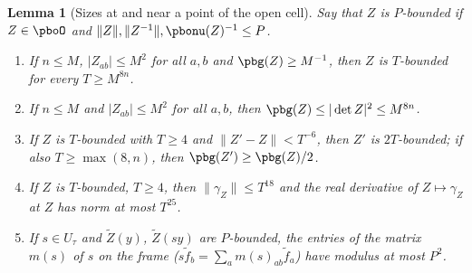 \documentclass[10pt]{amsart}
\newtheorem{lemma}[theorem]{Lemma}
\theoremstyle{definition}
\theoremstyle{remark}
\begin{document}
\begin{lemma}[Sizes at and near a point of the open cell]\label{pbo:sizes}
Say that $Z$ is \emph{$P$-bounded} if $Z\in\pboO$ and $\|Z\|,\|Z^{-1}\|,\pbonu(Z)^{-1}\le P$.
\begin{enumerate}
\item[(a)] If $n\le M$, $|Z_{ab}|\le M^2$ for all $a,b$ and $\pbg(Z)\ge M^{-1}$, then $Z$ is
$T$-bounded for every $T\ge M^{8n}$.
\item[(a$'$)] If $n\le M$ and $|Z_{ab}|\le M^2$ for all $a,b$, then $\pbg(Z)\le|\det Z|^2\le M^{8n}$.
\item[(b)] If $Z$ is $T$-bounded with $T\ge4$ and $\|Z'-Z\|<T^{-6}$, then $Z'$ is $2T$-bounded; if also
$T\ge\max(8,n)$, then $\pbg(Z')\ge\pbg(Z)/2$.
\item[(c)] If $Z$ is $T$-bounded, $T\ge4$, then $\|\gamma_Z\|\le T^{18}$ and the real derivative of
$Z\mapsto\gamma_Z$ at $Z$ has norm at most $T^{25}$.
\item[(d)] If $s\in U_\tau$ and $\tilde Z(y)$, $\tilde Z(sy)$ are $P$-bounded, the entries of the matrix
$m(s)$ of $s$ on the frame ($s\tilde f_b=\sum_am(s)_{ab}\tilde f_a$) have modulus at most $P^2$.
\end{enumerate}
\end{lemma}
\end{document}
